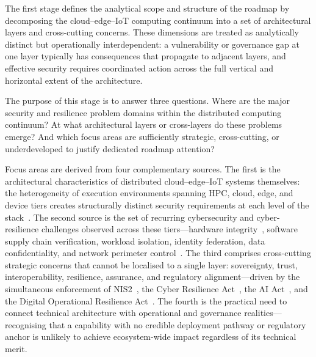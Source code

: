 The first stage defines the analytical scope and structure of the roadmap by decomposing the cloud--edge--IoT computing continuum into a set of architectural layers and cross-cutting concerns. These dimensions are treated as analytically distinct but operationally interdependent: a vulnerability or governance gap at one layer typically has consequences that propagate to adjacent layers, and effective security requires coordinated action across the full vertical and horizontal extent of the architecture.

The purpose of this stage is to answer three questions. Where are the major security and resilience problem domains within the distributed computing continuum? At what architectural layers or cross-layers do these problems emerge? And which focus areas are sufficiently strategic, cross-cutting, or underdeveloped to justify dedicated roadmap attention?

Focus areas are derived from four complementary sources. The first is the architectural characteristics of distributed cloud--edge--IoT systems themselves: the heterogeneity of execution environments spanning HPC, cloud, edge, and device tiers creates structurally distinct security requirements at each level of the stack~\cite{cloud_edge_roadmap}. The second source is the set of recurring cybersecurity and cyber-resilience challenges observed across these tiers---hardware integrity~\cite{iso11889}, software supply chain verification, workload isolation, identity federation, data confidentiality, and network perimeter control~\cite{3gpp33501}. The third comprises cross-cutting strategic concerns that cannot be localised to a single layer: sovereignty, trust, interoperability, resilience, assurance, and regulatory alignment---driven by the simultaneous enforcement of NIS2~\cite{nis2}, the Cyber Resilience Act~\cite{cra}, the AI Act~\cite{aiact}, and the Digital Operational Resilience Act~\cite{dora}. The fourth is the practical need to connect technical architecture with operational and governance realities---recognising that a capability with no credible deployment pathway or regulatory anchor is unlikely to achieve ecosystem-wide impact regardless of its technical merit.

